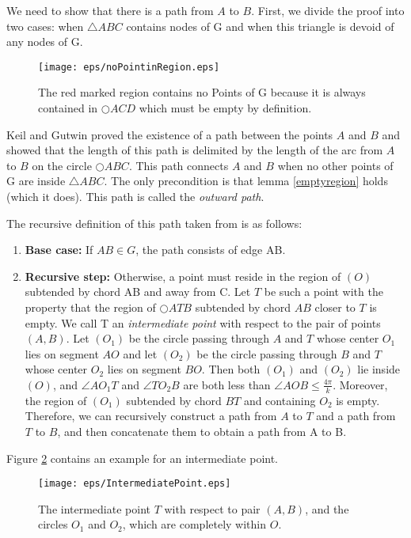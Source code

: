 We need to show that there is a path from $A $ to $B $.
First, we divide the proof into two cases: when $\triangle{ABC} $ contains nodes of G and when this triangle is devoid of any nodes of G.

\begin{figure}[h!]
\centering
\texttt{[image: eps/noPointinRegion.eps]}
\caption{The red marked region contains no Points of G because it is always contained in $\bigcirc{ACD} $ which must be empty by definition.}
\label{fig:empty_region}
\end{figure}

Keil and Gutwin \cite{keil} proved the existence of a path between the points $A $ and $B $ and showed that the length of this path is delimited by the length of the arc from $A $ to $B $ on the circle $\bigcirc{ABC} $.
This path connects $A $ and $B $ when no other points of G are inside $\triangle{ABC} $.
The only precondition is that lemma \ref{emptyregion} holds (which it does).
This path is called the \emph{outward path}.

The recursive definition of this path taken from \cite{kanj} is as follows:
\begin{enumerate}
\item \textbf{Base case:} If $AB \in G $, the path consists of edge AB.
\item \textbf{Recursive step:} Otherwise, a point must reside in the region of $(O) $ subtended by chord AB and away from C. 
Let $T $ be such a point with the property that the region of $\bigcirc{ATB} $ subtended by chord $AB $ closer to $T $ is empty. 
We call T an \emph{intermediate point} with respect to the pair of points $(A, B) $.
Let $(O_1) $ be the circle passing through $A $ and $T $ whose center $O_1 $ lies on segment $AO $  and let $(O_2) $ be the circle passing through $B $ and $T $ whose center $O_2 $ lies on segment $BO $.
Then both $(O_1) $ and $(O_2) $ lie inside $(O) $, and $\angle{AO_1T} $ and $\angle{TO_2B} $ are both less than $\angle{AOB} \leq \frac{4\pi}{k} $.
Moreover, the region of $(O_1) $ subtended by chord $BT $ and containing $O_2 $ is empty. Therefore, we can recursively construct a path from $A $ to $T $ and a path from $T $ to $B $, and then concatenate them to obtain a path from A to B.  
\end{enumerate}
Figure \ref{fig:intermediate_point} contains an example for an intermediate point.


\begin{figure}[h!]
\centering
\texttt{[image: eps/IntermediatePoint.eps]}
\caption{The intermediate point $T $ with respect to pair $(A,B) $, and the circles $O_1 $ and $O_2 $, which are completely within $O $. }
\label{fig:intermediate_point}
\end{figure}


